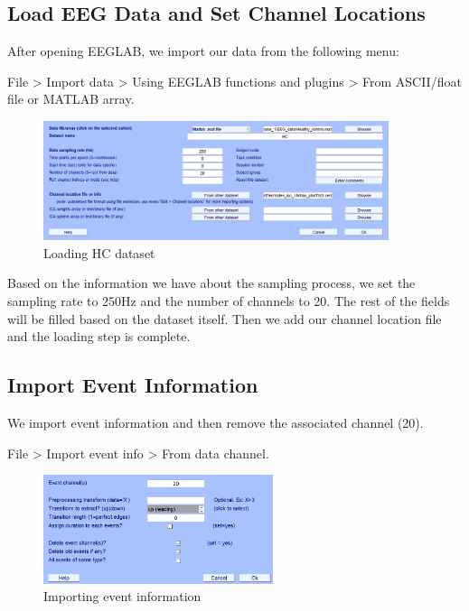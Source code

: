 \documentclass[hidelinks,12pt]{article}
\begin{document}
	\subsection{Load EEG Data and Set Channel Locations}
	After opening EEGLAB, we import our data from the following menu:
	
	File > Import data > Using EEGLAB functions and plugins > From ASCII/float file or MATLAB array.

		\begin{figure}[h!]
			\centering
			\includegraphics[width=0.9\textwidth]{1}
			\caption{Loading HC dataset}
		\end{figure}
		
	Based on the information we have about the sampling process, we set the sampling rate to 250Hz and the number of channels to 20. The rest of the fields will be filled based on the dataset itself. Then we add our channel location file and the loading step is complete.
	
	
	
	\subsection{Import Event Information}
	We import event information and then remove the associated channel (20).
	
	File > Import event info > From data channel.
	
		\begin{figure}[h!]
			\centering
			\includegraphics[width=0.6\textwidth]{2}
			\caption{Importing event information}
		\end{figure}
		
	
	\newpage
	
\end{document}
